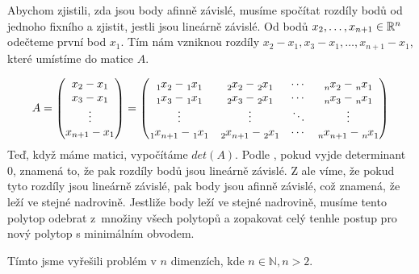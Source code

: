 Abychom zjistili, zda jsou body afinně závislé, musíme spočítat rozdíly bodů od jednoho fixního a zjistit, jestli jsou lineárně závislé. Od bodů $x_2, \ldots, x_{n+1} \in \mathbb{R}^n$ odečteme první bod $x_1$. Tím nám vzniknou rozdíly $x_2-x_1, x_3-x_1, \dots, x_{n+1}-x_1$, které umístíme do matice $A$. 


\begingroup
\renewcommand*{\arraystretch}{1.25}
\delimitershortfall=0pt
\begin{equation*}
  A =
  \begin{pmatrix}
    x_2-x_1 \\
    x_3-x_1 \\
    \vdots  \\
    x_{n+1}-x_1
  \end{pmatrix}
  =
  \begin{pmatrix}
    \x{1}{2} - \x{1}{1} & \x{2}{2} - \x{2}{1} & \cdots & \x{n}{2} - \x{n}{1} \\
    \x{1}{3} - \x{1}{1} & \x{2}{3} - \x{2}{1} & \cdots & \x{n}{3} - \x{n}{1} \\
    \vdots        & \vdots        & \ddots & \vdots        \\
    \x{1}{n_+_1} - \x{1}{1} & \x{2}{n_+_1} - \x{2}{1} & \cdots & \x{n}{n_+_1} - \x{n}{1} \\
  \end{pmatrix}
\end{equation*}
\endgroup
Teď, když máme matici, vypočítáme $det(A)$. Podle , pokud vyjde determinant $0$, znamená to, že pak rozdíly bodů jsou lineárně závislé. Z  ale víme, že pokud tyto rozdíly jsou lineárně závislé, pak body jsou afinně závislé, což znamená, že leží ve stejné nadrovině. Jestliže body leží ve stejné nadrovině, musíme tento polytop odebrat z~množiny všech polytopů a zopakovat celý tenhle postup pro nový polytop s minimálním obvodem. 

Tímto jsme vyřešili problém v $n$ dimenzích, kde $n \in \mathbb{N}, n > 2$.